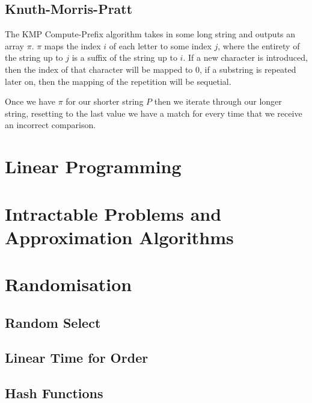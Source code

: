 \documentclass[a4paper]{article}
\begin{document}
\subsection{Knuth-Morris-Pratt}
The KMP Compute-Prefix algorithm takes in some long string and outputs an array $\pi$. $\pi$ maps the index $i$ of each letter to some index $j$, where the entirety of the string up to $j$ is a suffix of the string up to $i$. If a new character is introduced, then the index of that character will be mapped to 0, if a substring is repeated later on, then the mapping of the repetition will be sequetial.  

Once we have $\pi$ for our shorter string $P$ then we iterate through our longer string, resetting to the last value we have a match for every time that we receive an incorrect comparison. 

\section{Linear Programming}

\section{Intractable Problems and Approximation Algorithms}

\section{Randomisation}
\subsection{Random Select}
\subsection{Linear Time for Order}
\subsection{Hash Functions}
\end{document}
